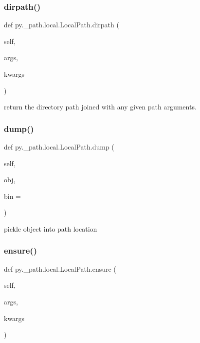 \subsubsection{\texorpdfstring{dirpath()}{dirpath()}}
{\footnotesize\ttfamily def py.\+\_\+path.\+local.\+Local\+Path.\+dirpath (\begin{DoxyParamCaption}\item[{}]{self,  }\item[{}]{args,  }\item[{}]{kwargs }\end{DoxyParamCaption})}

\begin{DoxyVerb}return the directory path joined with any given path arguments.  \end{DoxyVerb}
 \mbox{\label{classpy_1_1__path_1_1local_1_1_local_path_aa1515cfdf2ced35d5c3cabfef67d6f1d}} 
\subsubsection{\texorpdfstring{dump()}{dump()}}
{\footnotesize\ttfamily def py.\+\_\+path.\+local.\+Local\+Path.\+dump (\begin{DoxyParamCaption}\item[{}]{self,  }\item[{}]{obj,  }\item[{}]{bin = {} }\end{DoxyParamCaption})}

\begin{DoxyVerb}pickle object into path location\end{DoxyVerb}
 \mbox{\label{classpy_1_1__path_1_1local_1_1_local_path_a31bafde86b043a1a5804f9ed21996251}} 
\subsubsection{\texorpdfstring{ensure()}{ensure()}}
{\footnotesize\ttfamily def py.\+\_\+path.\+local.\+Local\+Path.\+ensure (\begin{DoxyParamCaption}\item[{}]{self,  }\item[{}]{args,  }\item[{}]{kwargs }\end{DoxyParamCaption})}

